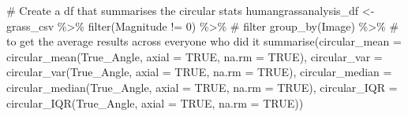 \documentclass[
]{article}
\newenvironment{Shaded}{\begin{snugshade}}{\end{snugshade}}
\newcommand{\AttributeTok}[1]{\textcolor[rgb]{0.40,0.45,0.13}{#1}}
\newcommand{\CommentTok}[1]{\textcolor[rgb]{0.37,0.37,0.37}{#1}}
\newcommand{\ConstantTok}[1]{\textcolor[rgb]{0.56,0.35,0.01}{#1}}
\newcommand{\DecValTok}[1]{\textcolor[rgb]{0.68,0.00,0.00}{#1}}
\newcommand{\FunctionTok}[1]{\textcolor[rgb]{0.28,0.35,0.67}{#1}}
\newcommand{\NormalTok}[1]{\textcolor[rgb]{0.00,0.23,0.31}{#1}}
\newcommand{\OtherTok}[1]{\textcolor[rgb]{0.00,0.23,0.31}{#1}}
\newcommand{\SpecialCharTok}[1]{\textcolor[rgb]{0.37,0.37,0.37}{#1}}
\begin{document}
\clearpage

\begin{Shaded}
\begin{Highlighting}[]
\CommentTok{\# Create a df that summarises the circular stats }
\NormalTok{humangrassanalysis\_df }\OtherTok{\textless{}{-}}
\NormalTok{  grass\_csv }\SpecialCharTok{\%\textgreater{}\%}
  \FunctionTok{filter}\NormalTok{(Magnitude }\SpecialCharTok{!=} \DecValTok{0}\NormalTok{) }\SpecialCharTok{\%\textgreater{}\%} \CommentTok{\# filter }
  \FunctionTok{group\_by}\NormalTok{(Image) }\SpecialCharTok{\%\textgreater{}\%} \CommentTok{\# to get the average results across everyone who did it}
  \FunctionTok{summarise}\NormalTok{(}\AttributeTok{circular\_mean =} \FunctionTok{circular\_mean}\NormalTok{(True\_Angle, }\AttributeTok{axial =} \ConstantTok{TRUE}\NormalTok{, }\AttributeTok{na.rm =} \ConstantTok{TRUE}\NormalTok{),}
            \AttributeTok{circular\_var =} \FunctionTok{circular\_var}\NormalTok{(True\_Angle, }\AttributeTok{axial =} \ConstantTok{TRUE}\NormalTok{, }\AttributeTok{na.rm =} \ConstantTok{TRUE}\NormalTok{),}
            \AttributeTok{circular\_median =} \FunctionTok{circular\_median}\NormalTok{(True\_Angle, }\AttributeTok{axial =} \ConstantTok{TRUE}\NormalTok{, }\AttributeTok{na.rm =} \ConstantTok{TRUE}\NormalTok{),}
            \AttributeTok{circular\_IQR =} \FunctionTok{circular\_IQR}\NormalTok{(True\_Angle, }\AttributeTok{axial =} \ConstantTok{TRUE}\NormalTok{, }\AttributeTok{na.rm =} \ConstantTok{TRUE}\NormalTok{))}
  
\end{Highlighting}
\end{Shaded}
\end{document}
